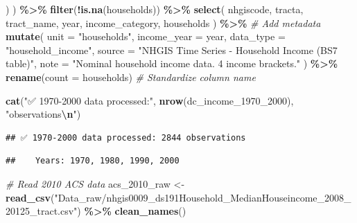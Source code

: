 \documentclass[
]{article}
\newenvironment{Shaded}{\begin{snugshade}}{\end{snugshade}}
\newcommand{\AttributeTok}[1]{\textcolor[rgb]{0.13,0.29,0.53}{#1}}
\newcommand{\CommentTok}[1]{\textcolor[rgb]{0.56,0.35,0.01}{\textit{#1}}}
\newcommand{\FunctionTok}[1]{\textcolor[rgb]{0.13,0.29,0.53}{\textbf{#1}}}
\newcommand{\NormalTok}[1]{#1}
\newcommand{\OtherTok}[1]{\textcolor[rgb]{0.56,0.35,0.01}{#1}}
\newcommand{\SpecialCharTok}[1]{\textcolor[rgb]{0.81,0.36,0.00}{\textbf{#1}}}
\newcommand{\StringTok}[1]{\textcolor[rgb]{0.31,0.60,0.02}{#1}}
\begin{document}
\begin{Shaded}
\begin{Highlighting}[]
\NormalTok{    )}
\NormalTok{  ) }\SpecialCharTok{\%\textgreater{}\%}
  \FunctionTok{filter}\NormalTok{(}\SpecialCharTok{!}\FunctionTok{is.na}\NormalTok{(households)) }\SpecialCharTok{\%\textgreater{}\%}
  \FunctionTok{select}\NormalTok{(}
\NormalTok{    nhgiscode,}
\NormalTok{    tracta,}
\NormalTok{    tract\_name,}
\NormalTok{    year,}
\NormalTok{    income\_category,}
\NormalTok{    households}
\NormalTok{  ) }\SpecialCharTok{\%\textgreater{}\%}
  \CommentTok{\# Add metadata}
  \FunctionTok{mutate}\NormalTok{(}
    \AttributeTok{unit =} \StringTok{"households"}\NormalTok{,}
    \AttributeTok{income\_year =}\NormalTok{ year,}
    \AttributeTok{data\_type =} \StringTok{"household\_income"}\NormalTok{,}
    \AttributeTok{source =} \StringTok{"NHGIS Time Series {-} Household Income (BS7 table)"}\NormalTok{,}
    \AttributeTok{note =} \StringTok{"Nominal household income data. 4 income brackets."}
\NormalTok{  ) }\SpecialCharTok{\%\textgreater{}\%}
  \FunctionTok{rename}\NormalTok{(}\AttributeTok{count =}\NormalTok{ households)  }\CommentTok{\# Standardize column name}

\FunctionTok{cat}\NormalTok{(}\StringTok{"✅ 1970{-}2000 data processed:"}\NormalTok{, }\FunctionTok{nrow}\NormalTok{(dc\_income\_1970\_2000), }\StringTok{"observations}\SpecialCharTok{\textbackslash{}n}\StringTok{"}\NormalTok{)}
\end{Highlighting}
\end{Shaded}

\begin{verbatim}
## ✅ 1970-2000 data processed: 2844 observations
\end{verbatim}

\begin{Shaded}
\end{Shaded}

\begin{verbatim}
##    Years: 1970, 1980, 1990, 2000
\end{verbatim}

\begin{Shaded}
\begin{Highlighting}[]
\CommentTok{\# Read 2010 ACS data}
\NormalTok{acs\_2010\_raw }\OtherTok{\textless{}{-}} \FunctionTok{read\_csv}\NormalTok{(}\StringTok{"Data\_raw/nhgis0009\_ds191Household\_MedianHouseincome\_2008\_20125\_tract.csv"}\NormalTok{) }\SpecialCharTok{\%\textgreater{}\%}
  \FunctionTok{clean\_names}\NormalTok{()}
\end{Highlighting}
\end{Shaded}
\end{document}
